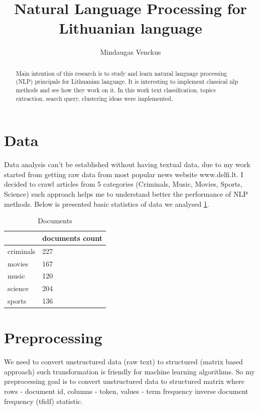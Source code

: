 \documentclass{article}
\begin{document}
\title{Natural Language Processing for Lithuanian language}
\author{Mindaugas Venckus}

\maketitle

\begin{abstract}
Main intention of this research is to study and learn natural language processing (NLP) principals  for Lithuanian language. It is interesting to implement classical nlp methods and see how they work on it. In this work text classification, topics extraction, search query, clustering ideas were implemented.
\end{abstract}

\section{Data}
Data analysis can't be established without having textual data, due to my work started from getting raw data from most popular news website www.delfi.lt. I decided to crawl articles from 5 categories (Criminals, Music, Movies, Sports, Science) such approach helps me to understand better the performance of NLP methods. Below is presented basic statistics of data we analysed  \ref{DocumentsTable}.
\begin{table}[htb]
\centering
\caption{Documents}
\label{DocumentsTable}
\begin{tabular}{|l|l|}
\hline
          & documents count \\ \hline
criminals & 227             \\ \hline
movies    & 167             \\ \hline
music     & 120             \\ \hline
science   & 204             \\ \hline
sports    & 136             \\ \hline
\end{tabular}
\end{table}
\section{Preprocessing}
 
We need to convert unstructured data (raw text) to structured (matrix based approach) such transformation is friendly for machine learning algorithms. So my preprocessing goal is to convert unstructured data to  structured matrix where rows - document id, columns - token, values - term frequency inverse document frequency (tfidf) statistic.
\end{document}
